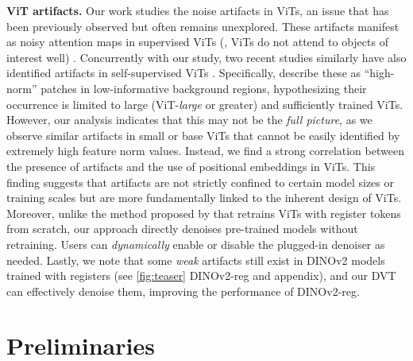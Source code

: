 \documentclass[runningheads]{llncs}
\newcommand{\ours}{DVT\xspace}
\renewcommand{\paragraph}[1]{\vspace{1.25mm}\noindent\textbf{#1}}
\begin{document}
\paragraph{ViT artifacts.} Our work studies the noise artifacts in ViTs, an issue that has been previously observed but often remains unexplored. These artifacts manifest as noisy attention maps in supervised ViTs (\ie, ViTs do not attend to objects of interest well) \cite{caron2021emerging,chen2021vision}. Concurrently with our study, two recent studies similarly have also identified artifacts in self-supervised ViTs \cite{yang2023emernerf,darcet2023vision}. Specifically, \cite{darcet2023vision} describe these as ``high-norm'' patches in low-informative background regions, hypothesizing their occurrence is limited to large (\eg ViT-\textit{large} or greater) and sufficiently trained ViTs. However, our analysis indicates that this may not be the \textit{full picture}, as we observe similar artifacts in small or base ViTs that cannot be easily identified by extremely high feature norm values. Instead, we find a strong correlation between the presence of artifacts and the use of positional embeddings in ViTs. This finding suggests that artifacts are not strictly confined to certain model sizes or training scales but are more fundamentally linked to the inherent design of ViTs.
Moreover, unlike the method proposed by \cite{darcet2023vision} that retrains ViTs with register tokens \cite{goyal2023think, xiao2023efficient} from scratch,
our approach directly denoises pre-trained models without retraining. Users can \textit{dynamically} enable or disable the plugged-in denoiser as needed. Lastly, we note that some \textit{weak} artifacts still exist in DINOv2 models trained with registers \cite{darcet2023vision} (see \cref{fig:teaser} DINOv2-reg and appendix), and our \ours can effectively denoise them, improving the performance of DINOv2-reg.

 \section{Preliminaries}
\label{sec:background}
\end{document}
